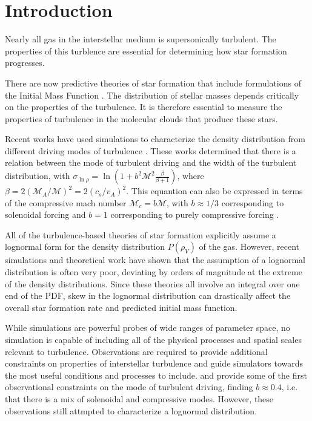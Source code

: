 
\section{Introduction}
Nearly all gas in the interstellar medium is supersonically turbulent.  The
properties of this turblence are essential for determining how star formation
progresses.

There are now predictive theories of star formation that include formulations
of the Initial Mass Function
\citep{Hopkins2012b,Chabrier2010a,Hennebelle2011a,Hennebelle2013a,Padoan2012a,Padoan2011b,Padoan2007a,Krumholz2005a}.
The distribution of stellar masses depends critically on the properties of the
turbulence.  It is therefore essential to measure the properties of turbulence in the
molecular clouds that produce these stars.

Recent works have used simulations to characterize the density distribution
from different driving modes of turbulence
\citep{Federrath2013a,Federrath2011a,Federrath2010a,Federrath2009a,Federrath2008a,Kritsuk2011a}.
These works determined that there is a relation between the mode of turbulent driving and the width
of the turbulent distribution, with $\sigma_{\ln \rho} = \ln(1+b^2 \mathcal{M}^2 \frac{\beta}{\beta+1})$,
where $\beta=2 (\mathcal{M}_A / \mathcal{M})^2 = 2 (c_s/v_A)^2$.
This equantion can also be expressed in terms of the compressive mach number
$\mathcal{M}_c = b \mathcal{M}$, with $b\approx 1/3$ corresponding to
solenoidal forcing and $b = 1$ corresponding to purely compressive forcing
\citep{Federrath2010a,Konstandin2012a,Molina2012a}.

All of the turbulence-based theories of star formation explicitly assume a
lognormal form for the density distribution $P(\rho_V)$ of the gas.  However,
recent simulations \citep{Federrath2013a} and theoretical work
\citep{Hopkins2013a} have shown that the assumption of a lognormal distribution
is often very poor, deviating by orders of magnitude at the extreme of the
density distributions.  Since these theories all involve an integral over one
end of the PDF, skew in the lognormal distribution can drastically affect the
overall star formation rate and predicted initial mass function.  

While simulations are powerful probes of wide ranges of parameter space, no
simulation is capable of including all of the physical processes and spatial
scales relevant to turbulence.  Observations are required to provide additional
constraints on properties of interstellar turbulence and guide simulators
towards the most useful conditions and processes to include.
\citet{Kainulainen2013a} and \citet{Kainulainen2012a} provide some of the first
observational constraints on the mode of turbulent driving, finding
$b\approx0.4$, i.e. that there is a mix of solenoidal and compressive modes.
However, these observations still attmpted to characterize a lognormal
distribution.


